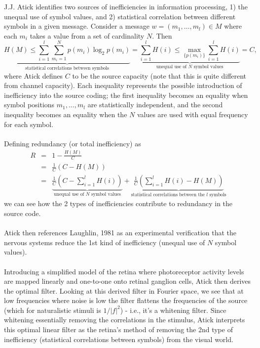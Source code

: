 \documentclass{article}
\begin{document}
J.J. Atick identifies two sources of inefficiencies in information processing, 1) the unequal use of symbol values, and 2) statistical correlation between different symbols in a given message.  Consider a message $w = (m_1, \dots, m_l) \in M$ where each $m_i$ takes a value from a set of cardinality $N$.  Then
\begin{equation}
\underset{\mbox{statistical correlations between symbols}}{\underbrace{H(M) \leq \sum_{i = 1}^l \sum_{m_i = 1}^N p(m_i) \log_2 p(m_i)}} = \underset{\mbox{unequal use of $N$ symbol values}}{\underbrace{\sum_{i = 1}^l H(i) \leq \max_{\{p(m_i)\}} \sum_{i = 1}^l H(i)}} = C,
\end{equation}
where Atick defines $C$ to be the source capacity (note that this is quite different from channel capacity).  Each inequality represents the possible introduction of inefficiency into the source coding; the first inequality becomes an equality when symbol positions $m_1, \dots, m_l$ are statistically independent, and the second inequality becomes an equality when the $N$ values are used with equal frequency for each symbol. \\
\\
Defining redundancy (or total inefficiency) as
\begin{eqnarray}
R &=& 1 - \frac{H(M)}{C} \\
&=& \frac{1}{C} \left (C - H(M) \right ) \\
&=&  \underset{\mbox{unequal use of $N$ symbol values}}{\underbrace{  \frac{1}{C} \left (C - \sum_{i =1}^l H(i) \right ) }} +  \underset{\mbox{statistical correlations between the $l$ symbols}}{\underbrace{ \frac{1}{C} \left ( \sum_{i=1}^l H(i) - H(M) \right)}}
\end{eqnarray}
we can see how the 2 types of inefficiencies contribute to redundancy in the source code. \\
\\
Atick then references Laughlin, 1981 as an experimental verification that the nervous systems reduce the 1st kind of inefficiency (unequal use of $N$ symbol values).\\
\\
Introducing a simplified model of the retina where photoreceptor activity levels are mapped linearly and one-to-one onto retinal ganglion cells, Atick then derives the optimal filter.  Looking at this derived filter in Fourier space, we see that at low frequencies where noise is low the filter flattens the frequencies of the source (which for naturalistic stimuli is $1/|f|^2$) - i.e., it's a whitening filter.  Since whitening essentially removing the correlations in the stimulus, Atick interprets this optimal linear filter as the retina's method of removing the 2nd type of inefficiency (statistical correlations between symbols) from the visual world.\\
\end{document}
